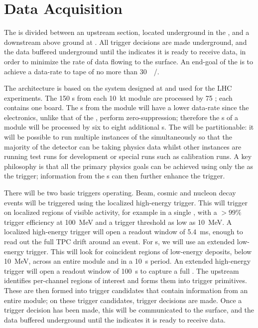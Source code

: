 \section{Data Acquisition}
\label{sec:fdsp-exec-daq}


The  is divided between an upstream section, located underground in the , and a downstream  above ground at . All trigger decisions are made underground, and the data buffered underground until the  indicates it is ready to receive data, in order to minimize the rate of data flowing to the surface. An end-goal of the  is to achieve a data-rate to tape of no more than \SI{30}{\peta\byte/\year}.

The  architecture is based on the  system designed at  and used for the LHC
experiments. The 150 s from each \SI{10}{\kilo\tonne} module are processed by 75 ; each  contains one  board. The s from the module will have a lower data-rate since the  electronics, unlike that of the , perform zero-suppression; therefore the s of a module will be processed by six to eight additional s. The  will be partitionable: it will be possible to run multiple instances of the  simultaneously so that the majority of the detector can be taking physics data whilst other  instances are running test runs for development or special runs such as calibration runs. A key philosophy is that all the primary  physics goals can be achieved using only the  as the trigger; information from the s can then further enhance the trigger.

There will be two basic triggers operating. Beam, cosmic and nucleon decay events will be triggered using the localized high-energy trigger. This will trigger on localized regions of visible activity, for example in a single , with a $>99\%$ trigger efficiency at \SI{100}{\mega\electronvolt} and a trigger threshold as low as \SI{10}{\mega\electronvolt}. A localized high-energy trigger will open a readout window of \SI{5.4}{\ms}, enough to read out the full TPC drift around an event. For s, we will use an extended low-energy trigger. This will look for coincident regions of low-energy deposits, below \SI{10}{\mega\electronvolt}, across an entire module and in a \SI{10}{\second} period. An extended high-energy trigger will open a readout window of \SI{100}{\second} to capture a full . The upstream  identifies per-channel regions of interest and forms them into trigger primitives. These are then formed into trigger candidates that contain information from an entire module; on these trigger candidates, trigger decisions are made. Once a trigger decision has been made, this will be communicated to the surface, and the data buffered underground until the  indicates it is ready to receive data.

